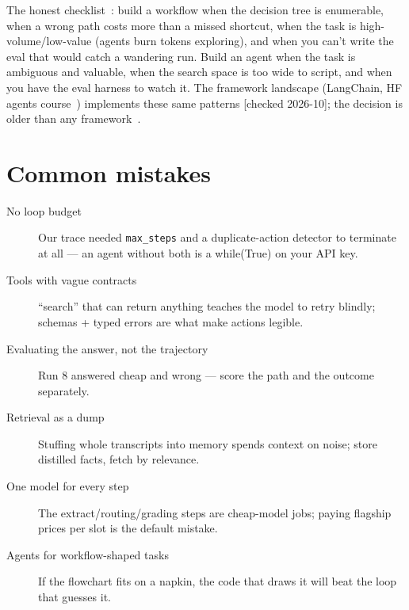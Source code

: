 The honest checklist~\cite{anthropic_agents}: build a workflow when
the decision tree is enumerable, when a wrong path costs more than a
missed shortcut, when the task is high-volume/low-value (agents burn
tokens exploring), and when you can't write the eval that would catch
a wandering run. Build an agent when the task is ambiguous and
valuable, when the search space is too wide to script, and when you
have the eval harness to watch it. The framework landscape
(LangChain, HF agents course~\cite{langchain,hf_agents}) implements
these same patterns [checked 2026-10]; the decision is older than any
framework~\cite{wiki_agent}.

\section{Common mistakes}
\label{sec:agentmistakes}

\begin{description}
\item[No loop budget] Our trace needed \texttt{max\_steps} and a
duplicate-action detector to terminate at all --- an agent without
both is a while(True) on your API key.
\item[Tools with vague contracts] ``search'' that can return anything
teaches the model to retry blindly; schemas + typed errors are what
make actions legible.
\item[Evaluating the answer, not the trajectory] Run 8 answered cheap
and wrong --- score the path and the outcome separately.
\item[Retrieval as a dump] Stuffing whole transcripts into memory
spends context on noise; store distilled facts, fetch by relevance.
\item[One model for every step] The extract/routing/grading steps are
cheap-model jobs; paying flagship prices per slot is the default
mistake.
\item[Agents for workflow-shaped tasks] If the flowchart fits on a
napkin, the code that draws it will beat the loop that guesses it.
\end{description}

